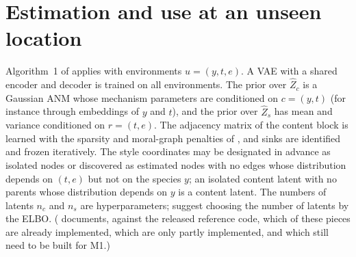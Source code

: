 \section{Estimation and use at an unseen location}
\label{sec:use}

Algorithm~1 of \cite{ng2025} applies with environments $u=(y,t,e)$. A VAE with a shared encoder and
decoder is trained on all environments. The prior over $\hat Z_c$ is a Gaussian ANM whose mechanism
parameters are conditioned on $c=(y,t)$ (for instance through embeddings of $y$ and $t$), and the prior over
$\hat Z_s$ has mean and variance conditioned on $r=(t,e)$. The adjacency matrix of the content block is learned
with the sparsity and moral-graph penalties of \cite{ng2025}, and sinks are identified and frozen
iteratively. The style coordinates may be designated in advance as isolated nodes or discovered as estimated
nodes with no edges whose distribution depends on $(t,e)$ but not on the species $y$; an isolated content
latent with no parents whose distribution depends on $y$ is a content latent. The numbers of latents $n_c$
and $n_s$ are hyperparameters; \cite{ng2025} suggest choosing the number of latents by the ELBO.
( documents, against the released reference code, which of these pieces are already
implemented, which are only partly implemented, and which still need to be built for M1.)

